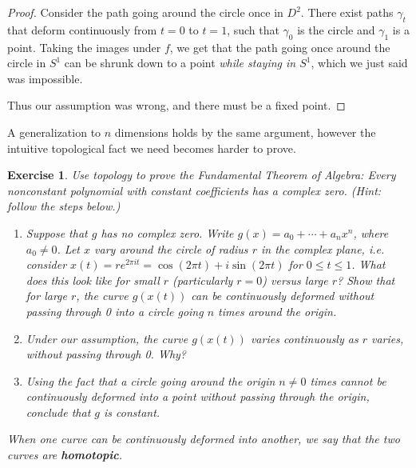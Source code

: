 \documentclass[12pt,twoside]{article}
\theoremstyle{norm}
\newtheorem{exr}[thm]{Exercise}
\begin{document}
\begin{proof}
Consider the path going around the circle once in $D^2$. There exist paths $\gamma_t$ that deform continuously from $t=0$ to $t=1$, such that $\gamma_0$ is the circle and $\gamma_1$ is a point. Taking the images under $f$, we get that the path going once around the circle in $S^1$ can be shrunk down to a point {\it while staying in $S^1$}, which we just said was impossible.

\begin{figure}[h!]
\end{figure}

Thus our assumption was wrong, and there must be a fixed point.
\end{proof}
A generalization to $n$ dimensions holds by the same argument, however the intuitive topological fact we need becomes harder to prove.
\begin{exr}
Use topology to prove the Fundamental Theorem of Algebra: Every nonconstant polynomial with constant coefficients has a complex zero. ({\it Hint: follow the steps below.})
\begin{enumerate}
\item 
Suppose that $g$ has no complex zero. Write $g(x)=a_0+\cdots +a_nx^n$, where $a_0\neq 0$. Let $x$ vary around the circle of radius $r$ in the complex plane, i.e. consider $x(t)=re^{2\pi it}=\cos(2\pi t)+i\sin(2\pi t)$ for $0\leq t\leq 1$. What does this look like for small $r$ (particularly $r=0$) versus large $r$? Show that for large $r$, the curve $g(x(t))$ can be continuously deformed {\it without passing through 0} into a circle going $n$ times around the origin.
\item
Under our assumption, the curve $g(x(t))$ varies continuously as $r$ varies, without passing through 0. Why?
\item
Using the fact that a circle going around the origin $n\neq 0$ times cannot be continuously deformed into a point without passing through the origin, conclude that $g$ is constant.
\end{enumerate}
When one curve can be continuously deformed into another, we say that the two curves are {\textbf{homotopic}}.
\end{exr}
\end{document}
